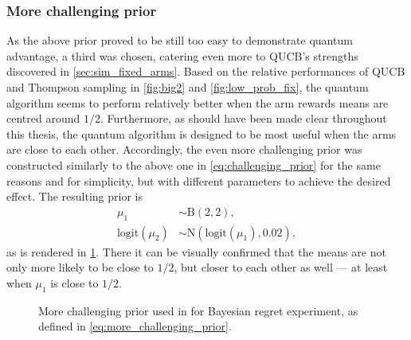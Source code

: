\pagebreak\clearpage
\subsubsection{More challenging prior}
As the above prior proved to be still too easy to demonstrate quantum advantage, a third was chosen, catering even more to QUCB's strengths discovered in \cref{sec:sim_fixed_arms}.
Based on the relative performances of QUCB and Thompson sampling in \cref{fig:big2} and \cref{fig:low_prob_fix}, the quantum algorithm seems to perform relatively better when the arm rewards means are centred around $1/2$.
Furthermore, as should have been made clear throughout this thesis, the quantum algorithm is designed to be most useful when the arms are close to each other.
Accordingly, the even more challenging prior was constructed similarly to the above one in \cref{eq:challenging_prior} for the same reasons and for simplicity, but with different parameters to achieve the desired effect.
The resulting prior is
\begin{equation}
    \label{eq:more_challenging_prior}
    \begin{aligned}
        \mu_1               & \sim \text{B}(2, 2),                      \\
        \text{logit}(\mu_2) & \sim \text{N}(\text{logit}(\mu_1), 0.02),
    \end{aligned}
\end{equation}
as is rendered in \cref{fig:prior2}.
There it can be visually confirmed that the means are not only more likely to be close to $1/2$, but closer to each other as well — at least when $\mu_1$ is close to $1/2$.

\begin{figure}[p]
    \centering
    \caption[
        More challenging prior used in Bayesian regret experiment.
    ]
    {
        More challenging prior used in for Bayesian regret experiment, as defined in \cref{eq:more_challenging_prior}.
    }
    \label{fig:prior2}
\end{figure}


